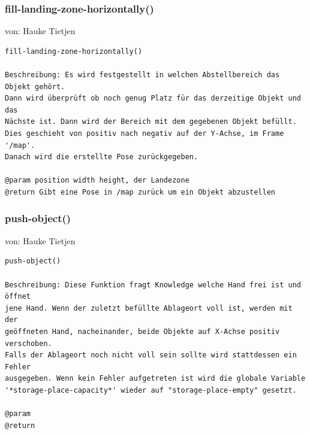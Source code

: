 \documentclass{suturo}
\makeatletter
\newcommand{\chapterauthor}[1]{%
  {\parindent0pt\vspace*{-27pt}%
  \linespread{0}\small\begin{flushright}von: #1\end{flushright}%
  \par\nobreak\vspace*{0pt}}
  \@afterheading%
}
\makeatother
\begin{document}
\subsubsection{fill-landing-zone-horizontally()}
\chapterauthor{Hauke Tietjen}
\begin{verbatim}
fill-landing-zone-horizontally()

Beschreibung: Es wird festgestellt in welchen Abstellbereich das Objekt gehört.
Dann wird überprüft ob noch genug Platz für das derzeitige Objekt und das 
Nächste ist. Dann wird der Bereich mit dem gegebenen Objekt befüllt.
Dies geschieht von positiv nach negativ auf der Y-Achse, im Frame '/map'.
Danach wird die erstellte Pose zurückgegeben.

@param position width height, der Landezone
@return Gibt eine Pose in /map zurück um ein Objekt abzustellen
\end{verbatim}

\begin{figure}[!htb]
\end{figure}

\subsubsection{push-object()}
\chapterauthor{Hauke Tietjen}
\begin{verbatim}
push-object()

Beschreibung: Diese Funktion fragt Knowledge welche Hand frei ist und öffnet 
jene Hand. Wenn der zuletzt befüllte Ablageort voll ist, werden mit der 
geöffneten Hand, nacheinander, beide Objekte auf X-Achse positiv verschoben. 
Falls der Ablageort noch nicht voll sein sollte wird stattdessen ein Fehler 
ausgegeben. Wenn kein Fehler aufgetreten ist wird die globale Variable 
'*storage-place-capacity*' wieder auf "storage-place-empty" gesetzt.

@param
@return
\end{verbatim}
\end{document}
